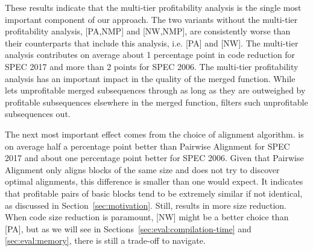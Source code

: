 

These results indicate that the multi-tier profitability analysis is the single most important component of our approach. 
The two variants without the multi-tier profitability analysis, [PA,NMP] and [NW,NMP], are consistently worse than their counterparts that include this analysis, i.e. [PA] and [NW]. The multi-tier analysis contributes on average about 1 percentage point in code reduction for SPEC 2017 and more than 2 points for SPEC 2006.
The multi-tier profitability analysis has an important impact in the quality of the merged function.
While {\SOAName} lets unprofitable merged subsequences through as long as they are outweighed by profitable subsequences elsewhere in the merged function, {\ProjName} filters such unprofitable subsequences out.

The next most important effect comes from the choice of alignment algorithm. {\NW} is on average half a percentage point better than Pairwise Alignment for SPEC 2017 and about one percentage point better for SPEC 2006. Given that Pairwise Alignment only aligns blocks of the same size and does not try to discover optimal alignments, this difference is smaller than one would expect.
It indicates that profitable pairs of basic blocks tend to be extremely similar if not identical, as discussed in Section~\ref{sec:motivation}.
Still, {\NW} results in more size reduction.
When code size reduction is paramount, [NW] might be a better choice than [PA], but as we will see in Sections~\ref{sec:eval:compilation-time} and \ref{sec:eval:memory}, there is still a trade-off to navigate.


